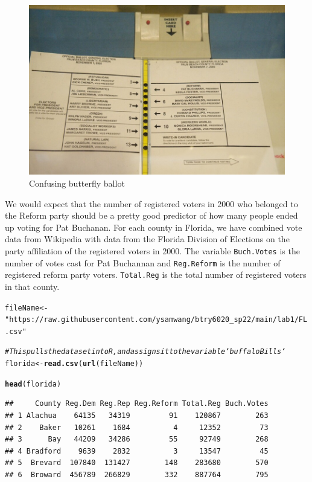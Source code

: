 \documentclass{article}\usepackage[]{graphicx}\usepackage[]{color}
\makeatletter
\newcommand{\hlstr}[1]{\textcolor[rgb]{0.192,0.494,0.8}{#1}}%
\newcommand{\hlcom}[1]{\textcolor[rgb]{0.678,0.584,0.686}{\textit{#1}}}%
\newcommand{\hlstd}[1]{\textcolor[rgb]{0.345,0.345,0.345}{#1}}%
\newcommand{\hlkwb}[1]{\textcolor[rgb]{0.69,0.353,0.396}{#1}}%
\newcommand{\hlkwd}[1]{\textcolor[rgb]{0.737,0.353,0.396}{\textbf{#1}}}%
\newenvironment{kframe}{%
 \def\at@end@of@kframe{}%
 \ifinner\ifhmode%
  \def\at@end@of@kframe{\end{minipage}}%
  \begin{minipage}{\columnwidth}%
 \fi\fi%
 \def\FrameCommand##1{\hskip\@totalleftmargin \hskip-\fboxsep
 \colorbox{shadecolor}{##1}\hskip-\fboxsep
     \hskip-\linewidth \hskip-\@totalleftmargin \hskip\columnwidth}%
 \MakeFramed {\advance\hsize-\width
   \@totalleftmargin\z@ \linewidth\hsize
   \@setminipage}}%
 {\par\unskip\endMakeFramed%
 \at@end@of@kframe}
\newenvironment{knitrout}{}{} %
\makeatother
\begin{document}
\begin{figure}[h]
\centering
\includegraphics[scale = .3]{butterfly}
\caption{Confusing butterfly ballot}
\end{figure}

\FloatBarrier

We would expect that the number of registered voters in 2000 who belonged to the Reform party should be a pretty good predictor of how many people ended up voting for Pat Buchanan. For each county in Florida, we have combined vote data from Wikipedia with data from the Florida Division of Elections on the party affiliation of the registered voters in 2000. The variable \texttt{Buch.Votes} is the number of votes cast for Pat Buchannan and \texttt{Reg.Reform} is the number of registered reform party voters. \texttt{Total.Reg} is the total number of registered voters in that county. 

\begin{knitrout}
\color{fgcolor}\begin{kframe}
\begin{alltt}
\hlstd{fileName} \hlkwb{<-} \hlstr{"https://raw.githubusercontent.com/ysamwang/btry6020_sp22/main/lab1/FL.csv"}

\hlcom{# This pulls the data set into R, and assigns it to the variable `buffaloBills`}
\hlstd{florida} \hlkwb{<-} \hlkwd{read.csv}\hlstd{(}\hlkwd{url}\hlstd{(fileName))}

\hlkwd{head}\hlstd{(florida)}
\end{alltt}
\begin{verbatim}
##     County Reg.Dem Reg.Rep Reg.Reform Total.Reg Buch.Votes
## 1 Alachua    64135   34319         91    120867        263
## 2    Baker   10261    1684          4     12352         73
## 3      Bay   44209   34286         55     92749        268
## 4 Bradford    9639    2832          3     13547         45
## 5  Brevard  107840  131427        148    283680        570
## 6  Broward  456789  266829        332    887764        795
\end{verbatim}
\end{kframe}
\end{knitrout}
\end{document}
